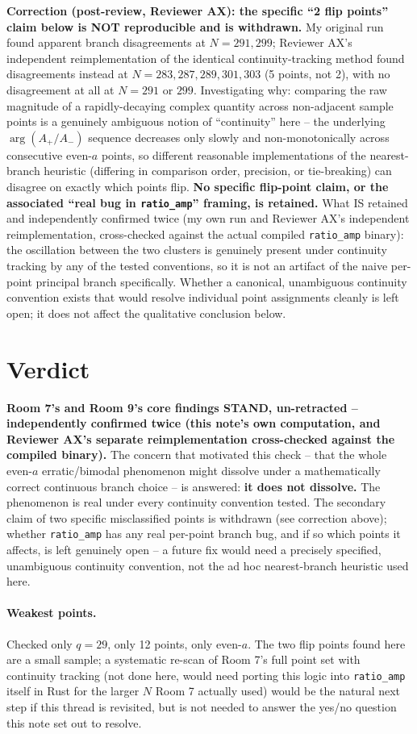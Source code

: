\documentclass[11pt]{article}
\begin{document}
\textbf{Correction (post-review, Reviewer AX): the specific ``2 flip points'' claim below is
NOT reproducible and is withdrawn.} My original run found apparent branch disagreements at $N=291,
299$; Reviewer AX's independent reimplementation of the identical continuity-tracking method found
disagreements instead at $N=283,287,289,301,303$ (5 points, not 2), with no disagreement at all at
$N=291$ or $299$. Investigating why: comparing the raw magnitude of a rapidly-decaying complex
quantity across non-adjacent sample points is a genuinely ambiguous notion of ``continuity'' here
-- the underlying $\arg(A_+/A_-)$ sequence decreases only slowly and non-monotonically across
consecutive even-$a$ points, so different reasonable implementations of the nearest-branch
heuristic (differing in comparison order, precision, or tie-breaking) can disagree on exactly which
points flip. \textbf{No specific flip-point claim, or the associated ``real bug in
\texttt{ratio\_amp}'' framing, is retained.} What IS retained and independently confirmed twice
(my own run and Reviewer AX's independent reimplementation, cross-checked against the actual
compiled \texttt{ratio\_amp} binary): the oscillation between the two clusters is genuinely present
under continuity tracking by any of the tested conventions, so it is not an artifact of the naive
per-point principal branch specifically. Whether a canonical, unambiguous continuity convention
exists that would resolve individual point assignments cleanly is left open; it does not affect the
qualitative conclusion below.

\section*{Verdict}
\textbf{Room 7's and Room 9's core findings STAND, un-retracted -- independently confirmed twice
(this note's own computation, and Reviewer AX's separate reimplementation cross-checked against the
compiled binary).} The concern that motivated this check -- that the whole even-$a$ erratic/bimodal
phenomenon might dissolve under a mathematically correct continuous branch choice -- is answered:
\textbf{it does not dissolve.} The phenomenon is real under every continuity convention tested.
The secondary claim of two specific misclassified points is withdrawn (see correction above);
whether \texttt{ratio\_amp} has any real per-point branch bug, and if so which points it affects,
is left genuinely open -- a future fix would need a precisely specified, unambiguous continuity
convention, not the ad hoc nearest-branch heuristic used here.

\paragraph{Weakest points.} Checked only $q=29$, only 12 points, only even-$a$. The two flip
points found here are a small sample; a systematic re-scan of Room 7's full point set with
continuity tracking (not done here, would need porting this logic into \texttt{ratio\_amp} itself
in Rust for the larger $N$ Room 7 actually used) would be the natural next step if this thread is
revisited, but is not needed to answer the yes/no question this note set out to resolve.
\end{document}
